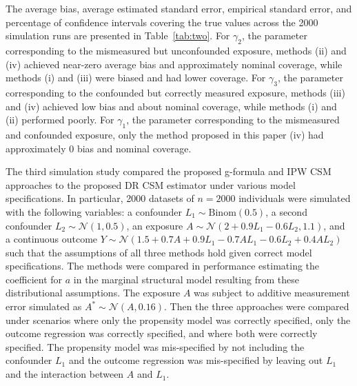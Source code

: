 \documentclass[useAMS,usenatbib,referee]{biom}
\begin{document}
The average bias, average estimated standard error, empirical standard error, and percentage of confidence intervals covering the true values across the 2000 simulation runs are presented in Table~\ref{tab:two}. For $\gamma_{2}$, the parameter corresponding to the mismeasured but unconfounded exposure, methods (ii) and (iv) achieved near-zero average bias and approximately nominal coverage, while methods (i) and (iii) were biased and had lower coverage. For $\gamma_{3}$, the parameter corresponding to the confounded but correctly measured exposure, methods (iii) and (iv) achieved low bias and about nominal coverage, while methods (i) and (ii) performed poorly. For $\gamma_{1}$, the parameter corresponding to the mismeasured and confounded exposure, only the method proposed in this paper (iv) had approximately 0 bias and nominal coverage.

The third simulation study compared the proposed g-formula and IPW CSM approaches to the proposed DR CSM estimator under various model specifications. In particular, 2000 datasets of $n = 2000$ individuals were simulated with the following variables: a confounder $L_{1} \sim \text{Binom}(0.5)$, a second confounder $L_{2} \sim \mathcal{N}(1, 0.5)$, an exposure $A \sim \mathcal{N}(2 + 0.9L_{1} - 0.6L_{2}, 1.1)$, and a continuous outcome $Y \sim \mathcal{N}(1.5 + 0.7A + 0.9L_{1} - 0.7AL_{1} - 0.6L_{2} + 0.4AL_{2})$ such that the assumptions of all three methods hold given correct model specifications. The methods were compared in performance estimating the coefficient for $a$ in the marginal structural model resulting from these distributional assumptions. The exposure $A$ was subject to additive measurement error simulated as $A^{*} \sim \mathcal{N}(A, 0.16)$. Then the three approaches were compared under scenarios where only the propensity model was correctly specified, only the outcome regression was correctly specified, and where both were correctly specified. The propensity model was mis-specified by not including the confounder $L_{1}$ and the outcome regression was mis-specified by leaving out $L_{1}$ and the interaction between $A$ and $L_{1}$.
\end{document}
